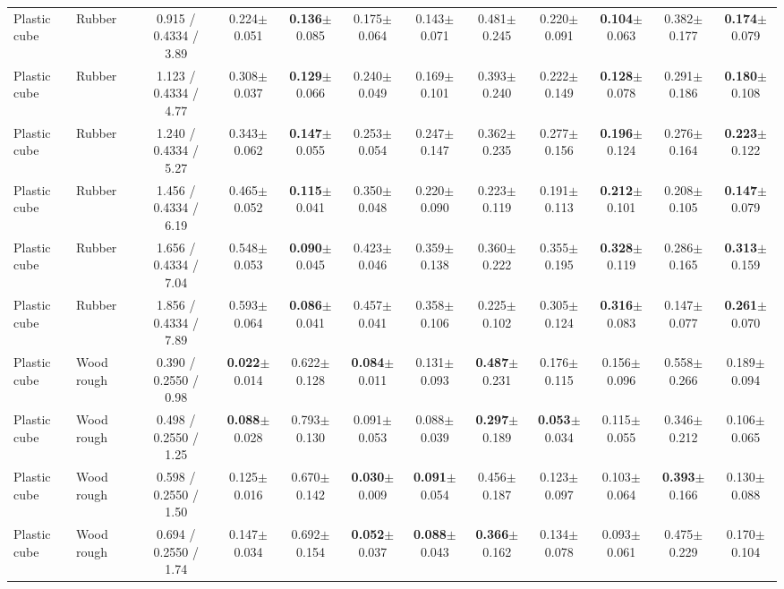 \begin{table}[t]
{\begin{tabular}{l l c c c c c c c c c c }
        Plastic cube & Rubber & 0.915 / 0.4334 / 3.89 & 0.224$\pm$0.051 & \textbf{0.136}$\pm$0.085 & 0.175$\pm$0.064 & 0.143$\pm$0.071 & 0.481$\pm$0.245 & 0.220$\pm$0.091 & \textbf{0.104}$\pm$0.063 & 0.382$\pm$0.177 & \textbf{0.174}$\pm$0.079 \\
        Plastic cube & Rubber & 1.123 / 0.4334 / 4.77 & 0.308$\pm$0.037 & \textbf{0.129}$\pm$0.066 & 0.240$\pm$0.049 & 0.169$\pm$0.101 & 0.393$\pm$0.240 & 0.222$\pm$0.149 & \textbf{0.128}$\pm$0.078 & 0.291$\pm$0.186 & \textbf{0.180}$\pm$0.108 \\
        Plastic cube & Rubber & 1.240 / 0.4334 / 5.27 & 0.343$\pm$0.062 & \textbf{0.147}$\pm$0.055 & 0.253$\pm$0.054 & 0.247$\pm$0.147 & 0.362$\pm$0.235 & 0.277$\pm$0.156 & \textbf{0.196}$\pm$0.124 & 0.276$\pm$0.164 & \textbf{0.223}$\pm$0.122 \\
        Plastic cube & Rubber & 1.456 / 0.4334 / 6.19 & 0.465$\pm$0.052 & \textbf{0.115}$\pm$0.041 & 0.350$\pm$0.048 & 0.220$\pm$0.090 & 0.223$\pm$0.119 & 0.191$\pm$0.113 & \textbf{0.212}$\pm$0.101 & 0.208$\pm$0.105 & \textbf{0.147}$\pm$0.079 \\
        Plastic cube & Rubber & 1.656 / 0.4334 / 7.04 & 0.548$\pm$0.053 & \textbf{0.090}$\pm$0.045 & 0.423$\pm$0.046 & 0.359$\pm$0.138 & 0.360$\pm$0.222 & 0.355$\pm$0.195 & \textbf{0.328}$\pm$0.119 & 0.286$\pm$0.165 & \textbf{0.313}$\pm$0.159 \\
        Plastic cube & Rubber & 1.856 / 0.4334 / 7.89 & 0.593$\pm$0.064 & \textbf{0.086}$\pm$0.041 & 0.457$\pm$0.041 & 0.358$\pm$0.106 & 0.225$\pm$0.102 & 0.305$\pm$0.124 & \textbf{0.316}$\pm$0.083 & 0.147$\pm$0.077 & \textbf{0.261}$\pm$0.070 \\
        Plastic cube & Wood rough & 0.390 / 0.2550 / 0.98 & \textbf{0.022}$\pm$0.014 & 0.622$\pm$0.128 & \textbf{0.084}$\pm$0.011 & 0.131$\pm$0.093 & \textbf{0.487}$\pm$0.231 & 0.176$\pm$0.115 & 0.156$\pm$0.096 & 0.558$\pm$0.266 & 0.189$\pm$0.094 \\
        Plastic cube & Wood rough & 0.498 / 0.2550 / 1.25 & \textbf{0.088}$\pm$0.028 & 0.793$\pm$0.130 & 0.091$\pm$0.053 & 0.088$\pm$0.039 & \textbf{0.297}$\pm$0.189 & \textbf{0.053}$\pm$0.034 & 0.115$\pm$0.055 & 0.346$\pm$0.212 & 0.106$\pm$0.065 \\
        Plastic cube & Wood rough & 0.598 / 0.2550 / 1.50 & 0.125$\pm$0.016 & 0.670$\pm$0.142 & \textbf{0.030}$\pm$0.009 & \textbf{0.091}$\pm$0.054 & 0.456$\pm$0.187 & 0.123$\pm$0.097 & 0.103$\pm$0.064 & \textbf{0.393}$\pm$0.166 & 0.130$\pm$0.088 \\
        Plastic cube & Wood rough & 0.694 / 0.2550 / 1.74 & 0.147$\pm$0.034 & 0.692$\pm$0.154 & \textbf{0.052}$\pm$0.037 & \textbf{0.088}$\pm$0.043 & \textbf{0.366}$\pm$0.162 & 0.134$\pm$0.078 & 0.093$\pm$0.061 & 0.475$\pm$0.229 & 0.170$\pm$0.104 \\

\end{tabular}}
\end{table}
